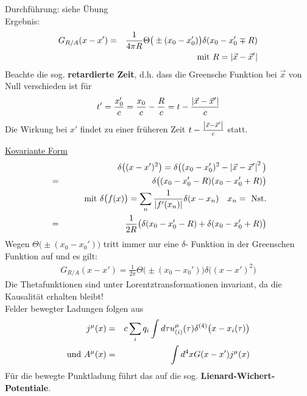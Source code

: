 Durchführung: siehe Übung\\
Ergebnis:
\begin{eqnarray*} G_ {R/A}(x-x') &=& \frac 1 {4\pi R}\Theta\big (\pm(x_0-x_0')\big )\delta(x_0-x_0'\mp R)\\&{}& \text{mit   } R = \left|\vec x-\vec x'\right|\end{eqnarray*}
Beachte die sog. {\bf retardierte Zeit}, d.h. dass die Greensche Funktion bei $\vec x$ von Null verschieden ist für 
\begin{eqnarray*}
t' = \frac{x_0'}c = \frac {x_0}c - \frac R c = t - \frac{\left|\vec x-\vec x'\right|}c
\end{eqnarray*}
Die Wirkung bei $x'$ findet zu einer früheren Zeit $t - \frac{\left|\vec x-\vec x'\right|}c$ statt.
\vspace{1.5cm}

\underline {Kovariante Form}
\begin{eqnarray*} &{}& \delta\big((x-x')^ 2\big) = \delta\big((x_0-x_0')^ 2- \left|\vec x-\vec x'\right|^ 2\big) \\
&=& \delta\big((x_0-x_0'-R)(x_0-x_0'+R)\big) \\
&{}&\qquad \text{mit  }\delta\big(f(x)\big) = \sum\limits_n \frac 1 {\left|f'(x_n)\right|}\delta(x-x_n)\quad x_n = \text{ Nst.}\\
&=& \frac 1 { 2R} \big( \delta(x_0-x_0' -R) + \delta(x_0-x_0' + R)\big)
\end{eqnarray*}
Wegen $\Theta\big(\pm (x_0-x_0')\big)$ tritt immer nur eine $\delta$- Funktion in der Greenschen Funktion auf und es gilt:
\begin{eqnarray*} \boxed{G_{R/A}(x-x') = \frac 1 {2\pi} \Theta\big(\pm (x_0-x_0')\big)\delta\big((x-x')^ 2\big)}\end{eqnarray*}
Die Thetafunktionen sind unter  Lorentztransformationen invariant, da die Kausalität erhalten bleibt!\\
Felder bewegter Ladungen folgen aus
\begin{eqnarray*}
j^ {\mu}(x) &=& c \sum \limits_i q_i \int d\tau u_{(i)}^ {\mu}(\tau)\delta^  {(4)}\big(x-x_i(\tau)\big)\\\text{und} \ A^ {\mu}(x) &=& \int d^ 4x G(x-x') j^ {\mu}(x)
\end{eqnarray*}
Für die bewegte Punktladung führt das auf die sog. {\bf Lienard-Wichert-Potentiale}.


